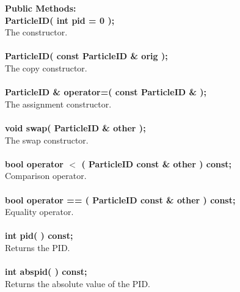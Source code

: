 \documentclass[twoside,12pt]{article}
\begin{document}
\begin{tabbing}
{\bf Public Methods:} \\
\hspace{0.5in}  {\bf ParticleID( int pid = 0 ); } \\
\hspace{0.5in}  The constructor.\\ \\
\hspace{0.5in}  {\bf ParticleID( const ParticleID \& orig ); } \\
\hspace{0.5in}  The copy constructor. \\ \\
\hspace{0.5in}  {\bf ParticleID \& operator=( const ParticleID \& ); } \\
\hspace{0.5in}  The assignment constructor. \\ \\
\hspace{0.5in}  {\bf void swap( ParticleID \& other ); } \\
\hspace{0.5in}  The swap constructor. \\ \\
\hspace{0.5in}  {\bf bool  operator $<$  ( ParticleID const \& other ) const;} \\
\hspace{0.5in}  Comparison operator. \\ \\
\hspace{0.5in}  {\bf bool  operator == ( ParticleID const \& other ) const;} \\
\hspace{0.5in}  Equality operator. \\ \\

\hspace{0.5in}  {\bf int    pid( )        const; } \\
\hspace{0.5in}  Returns the PID. \\ \\
\hspace{0.5in}  {\bf int abspid( )        const; } \\
\hspace{0.5in}  Returns the absolute value of the PID. \\ \\


\end{tabbing}
\end{document}
